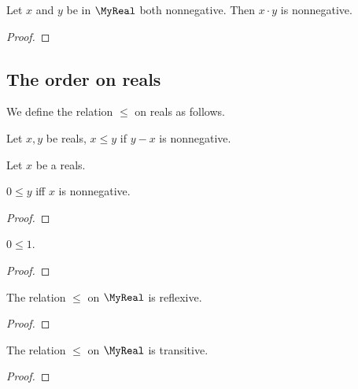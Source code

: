 \begin{lemma}
    \leanok
    Let $x$ and $y$ be in $\MyReal$ both nonnegative. Then $x \cdot y$ is nonnegative.
\end{lemma}
\begin{proof}
    \leanok
\end{proof}

\subsection{The order on reals}

\begin{definition}
    \leanok
    We define the relation $\leq$ on reals as follows.

    Let $x,y$ be reals, $x \leq y$ if $y - x$ is nonnegative.
\end{definition}

\begin{lemma}
    \leanok
    Let $x$ be a reals.

    $0 \leq y$ iff $x$ is nonnegative.
\end{lemma}
\begin{proof}
    \leanok
\end{proof}

\begin{lemma}
    \leanok
    $0 \leq 1$.
\end{lemma}
\begin{proof}
    \leanok
\end{proof}

\begin{lemma}
    \leanok
    The relation $\leq$ on $\MyReal$ is reflexive.
\end{lemma}
\begin{proof}
    \leanok
\end{proof}

\begin{lemma}
    \leanok
    The relation $\leq$ on $\MyReal$ is transitive.
\end{lemma}
\begin{proof}
    \leanok
\end{proof}

